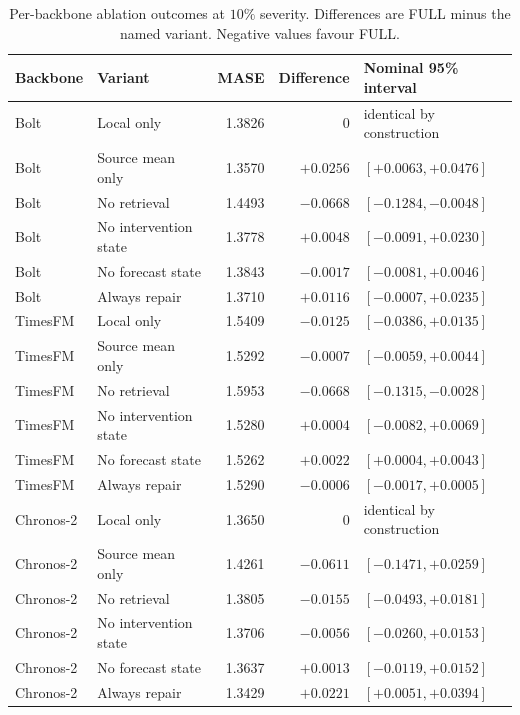 \documentclass{article}
\begin{document}
\begin{table}[!t]
\centering\small
\caption{Per-backbone ablation outcomes at $10\%$ severity. Differences are FULL minus the
named variant. Negative values favour FULL.}
\label{tab:v52-a2}
\begin{tabular*}{\textwidth}{@{\extracolsep{\fill}}llrrl@{}}
\toprule
Backbone & Variant & MASE & Difference & Nominal 95\% interval \\
\midrule
Bolt & Local only & 1.3826 & $0$ & identical by construction \\
Bolt & Source mean only & 1.3570 & $+0.0256$ & $[+0.0063,+0.0476]$ \\
Bolt & No retrieval & 1.4493 & $-0.0668$ & $[-0.1284,-0.0048]$ \\
Bolt & No intervention state & 1.3778 & $+0.0048$ & $[-0.0091,+0.0230]$ \\
Bolt & No forecast state & 1.3843 & $-0.0017$ & $[-0.0081,+0.0046]$ \\
Bolt & Always repair & 1.3710 & $+0.0116$ & $[-0.0007,+0.0235]$ \\
TimesFM & Local only & 1.5409 & $-0.0125$ & $[-0.0386,+0.0135]$ \\
TimesFM & Source mean only & 1.5292 & $-0.0007$ & $[-0.0059,+0.0044]$ \\
TimesFM & No retrieval & 1.5953 & $-0.0668$ & $[-0.1315,-0.0028]$ \\
TimesFM & No intervention state & 1.5280 & $+0.0004$ & $[-0.0082,+0.0069]$ \\
TimesFM & No forecast state & 1.5262 & $+0.0022$ & $[+0.0004,+0.0043]$ \\
TimesFM & Always repair & 1.5290 & $-0.0006$ & $[-0.0017,+0.0005]$ \\
Chronos-2 & Local only & 1.3650 & $0$ & identical by construction \\
Chronos-2 & Source mean only & 1.4261 & $-0.0611$ & $[-0.1471,+0.0259]$ \\
Chronos-2 & No retrieval & 1.3805 & $-0.0155$ & $[-0.0493,+0.0181]$ \\
Chronos-2 & No intervention state & 1.3706 & $-0.0056$ & $[-0.0260,+0.0153]$ \\
Chronos-2 & No forecast state & 1.3637 & $+0.0013$ & $[-0.0119,+0.0152]$ \\
Chronos-2 & Always repair & 1.3429 & $+0.0221$ & $[+0.0051,+0.0394]$ \\
\bottomrule
\end{tabular*}
\end{table}
\end{document}
